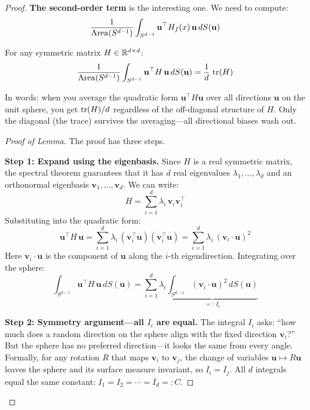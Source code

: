\begin{notechapter}
\begin{proof}
\textbf{The second-order term} is the interesting one. We need to compute:
\[
\frac{1}{\operatorname{Area}(S^{d-1})} \int_{S^{d-1}}
  \mathbf{u}^\top H_f(x)\,\mathbf{u}\,dS(\mathbf{u})
\]

\begin{lemma}
\label{harmonic-functions:lem:sphere_average_quadratic}
For any symmetric matrix $H \in \mathbb{R}^{d \times d}$:
\begin{equation}
\frac{1}{\operatorname{Area}(S^{d-1})} \int_{S^{d-1}}
  \mathbf{u}^\top H\,\mathbf{u}\,dS(\mathbf{u}) = \frac{1}{d}\,\operatorname{tr}(H)
\end{equation}
\end{lemma}

In words: when you average the quadratic form $\mathbf{u}^\top H\mathbf{u}$
over all directions $\mathbf{u}$ on the unit sphere, you get $\operatorname{tr}(H)/d$
regardless of the off-diagonal structure of $H$. Only the diagonal (the
trace) survives the averaging---all directional biases wash out.

\begin{proof}[Proof of Lemma]
The proof has three steps.

\textbf{Step 1: Expand using the eigenbasis.} Since $H$ is a real symmetric
matrix, the spectral theorem guarantees that it has $d$ real eigenvalues
$\lambda_1, \ldots, \lambda_d$ and an orthonormal eigenbasis
$\mathbf{v}_1, \ldots, \mathbf{v}_d$. We can write:
\[
H = \sum_{i=1}^d \lambda_i\,\mathbf{v}_i\mathbf{v}_i^\top
\]
Substituting into the quadratic form:
\[
\mathbf{u}^\top H\,\mathbf{u}
= \sum_{i=1}^d \lambda_i\,
  (\mathbf{v}_i^\top\mathbf{u})(\mathbf{v}_i^\top\mathbf{u})
= \sum_{i=1}^d \lambda_i\,(\mathbf{v}_i \cdot \mathbf{u})^2
\]
Here $\mathbf{v}_i \cdot \mathbf{u}$ is the component of $\mathbf{u}$ along
the $i$-th eigendirection. Integrating over the sphere:
\begin{equation}
\label{harmonic-functions:eq:quadratic_expansion}
\int_{S^{d-1}} \mathbf{u}^\top H\,\mathbf{u}\,dS(\mathbf{u})
= \sum_{i=1}^d \lambda_i
  \underbrace{\int_{S^{d-1}}(\mathbf{v}_i \cdot \mathbf{u})^2\,
  dS(\mathbf{u})}_{=:\, I_i}
\end{equation}

\textbf{Step 2: Symmetry argument---all $I_i$ are equal.} The integral $I_i$
asks: ``how much does a random direction on the sphere align with the fixed
direction $\mathbf{v}_i$?'' But the sphere has no preferred direction---it
looks the same from every angle. Formally, for any rotation $R$ that maps
$\mathbf{v}_i$ to $\mathbf{v}_j$, the change of variables
$\mathbf{u} \mapsto R\mathbf{u}$ leaves the sphere and its surface measure
invariant, so $I_i = I_j$. All $d$ integrals equal the same constant:
$I_1 = I_2 = \cdots = I_d =: C$.


\end{proof}
\end{proof}
\end{notechapter}
